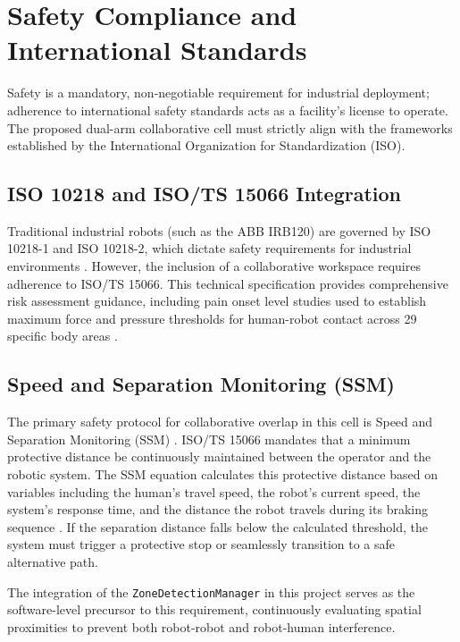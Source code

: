 \section{Safety Compliance and International Standards}

Safety is a mandatory, non-negotiable requirement for industrial deployment; adherence to international safety standards acts as a facility's license to operate. The proposed dual-arm collaborative cell must strictly align with the frameworks established by the International Organization for Standardization (ISO).

\subsection{ISO 10218 and ISO/TS 15066 Integration}
Traditional industrial robots (such as the ABB IRB120) are governed by ISO 10218-1 and ISO 10218-2, which dictate safety requirements for industrial environments \cite{iso15066}. However, the inclusion of a collaborative workspace requires adherence to ISO/TS 15066. This technical specification provides comprehensive risk assessment guidance, including pain onset level studies used to establish maximum force and pressure thresholds for human-robot contact across 29 specific body areas \cite{robotiq2016iso}.

\subsection{Speed and Separation Monitoring (SSM)}
The primary safety protocol for collaborative overlap in this cell is Speed and Separation Monitoring (SSM) \cite{nist2016ssm}. ISO/TS 15066 mandates that a minimum protective distance be continuously maintained between the operator and the robotic system. The SSM equation calculates this protective distance based on variables including the human's travel speed, the robot's current speed, the system's response time, and the distance the robot travels during its braking sequence \cite{robotiq2016iso}. If the separation distance falls below the calculated threshold, the system must trigger a protective stop or seamlessly transition to a safe alternative path.

The integration of the \texttt{ZoneDetectionManager} in this project serves as the software-level precursor to this requirement, continuously evaluating spatial proximities to prevent both robot-robot and robot-human interference.